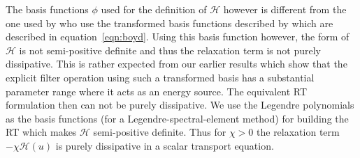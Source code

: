 The basis functions $\phi$ used for the definition of $\mathcal{H}$ however is different from the one used by \cite{malm13} who use the transformed basis functions described by \cite{boyd98} which are described in equation~\ref{eqn:boyd}. Using this basis function however, the form of $\mathcal{H}$ is not semi-positive definite and thus the relaxation term is not purely dissipative. This is rather expected from our earlier results which show that the explicit filter operation using such a transformed basis has a substantial parameter range where it acts as an energy source. The equivalent RT formulation then can not be purely dissipative. We use the Legendre polynomials as the basis functions (for a Legendre-spectral-element method) for building the RT which makes $\mathcal{H}$ semi-positive definite. Thus for $\chi>0$ the relaxation term $-\chi\mathcal{H}(u)$ is purely dissipative in a scalar transport equation.

